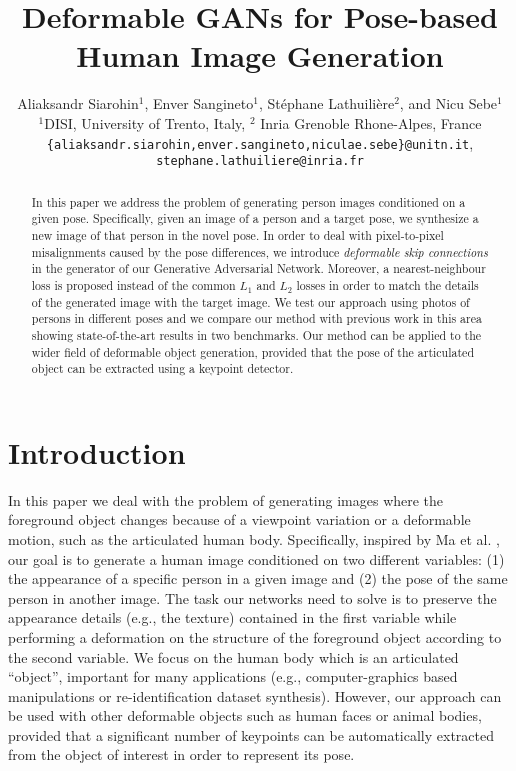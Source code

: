 \documentclass[10pt,twocolumn,letterpaper]{article}
\begin{document}
\title{Deformable GANs for Pose-based Human Image Generation}

\author{Aliaksandr Siarohin$^1$, Enver Sangineto$^1$, St{\'e}phane Lathuili{\`e}re$^2$, and Nicu Sebe$^1$\\
$^1$DISI, University of Trento, Italy, \hspace{\columnsep} $^2$ Inria Grenoble Rhone-Alpes, France\\
{\tt\small \{aliaksandr.siarohin,enver.sangineto,niculae.sebe\}@unitn.it}, {\tt\small stephane.lathuiliere@inria.fr}
}

\maketitle
\thispagestyle{empty}

\begin{abstract}
In this paper we address the problem of generating person images   conditioned on a given pose. 
Specifically, given an image of a person and a target pose, we synthesize a new image of that person in the novel pose. In order to deal with pixel-to-pixel misalignments caused by the pose differences, we introduce {\em deformable skip connections} in  the  generator  of our Generative Adversarial Network. Moreover, a nearest-neighbour loss is proposed instead of the common $L_1$ and $L_2$ losses in order to match the details of the generated image with the target image.
We test  our approach using  photos of persons in different poses and we compare our method with previous work in this area showing state-of-the-art results in two  benchmarks.
Our method can be applied to the wider field of deformable object generation, provided that the pose of the articulated object can be extracted using a keypoint detector.
\end{abstract}

\section{Introduction}
\label{Introduction}

In this paper we deal with the problem of generating images where the foreground object changes because of a viewpoint variation or a deformable motion, such as the articulated human body. 
Specifically, inspired by Ma et al. \cite{ma2017pose}, our goal is to generate a human image  conditioned on two different variables: (1) the appearance of a specific person in a given image and (2) the pose 
of the same 
person in another image.
The task our networks 
need to solve is to preserve the appearance details (e.g., the texture) contained in  the first variable while performing a deformation on the structure of the foreground object according to the second variable.
We focus on the human body which is an articulated ``object'', important for many applications (e.g., computer-graphics based manipulations or re-identification dataset synthesis). However, our approach can be used with other deformable objects such as human faces or animal bodies, provided that a significant number of keypoints can be automatically extracted from the object of interest in order to represent its pose.
\end{document}

